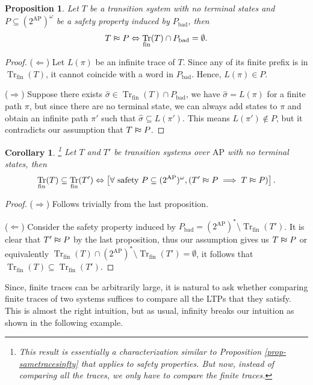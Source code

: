 \documentclass{tufte-handout} %
\newtheorem{cor}[thm]{Corollary}
\newtheorem{prop}[thm]{Proposition}
\theoremstyle{definition}
\theoremstyle{remark}
\newcommand{\0}{\textsf{0}}
\newcommand{\1}{\textsf{1}}
\newcommand{\AP}{\text{AP}}
\DeclareMathOperator{\Tr}{Tr}
\newcommand{\vSim}{\mathrel{\scalebox{1}[1.5]{$\shortmid$}\mkern-3.5mu\raisebox{0.1ex}{$\approx$}}}
\begin{document}
\begin{prop}
	Let $T$ be a transition system with no terminal states and $P\subseteq (2^{\AP})^{\omega}$ be a safety property induced by $P_{\text{bad}}$, then \[T \vSim P \Leftrightarrow \Tr_{\text{fin}}(T) \cap P_{\text{bad}} = \emptyset.\]
\end{prop}
\begin{proof}
	($\Leftarrow$) Let $L(\pi)$ be an infinite trace of $T$. Since any of its finite prefix is in $\Tr_{\text{fin}}(T)$, it cannot coincide with a word in $P_{\text{bad}}$. Hence, $L(\pi) \in P$.
	
	($\Rightarrow$) Suppose there exists $\hat{\sigma}\in \Tr_{\text{fin}}(T) \cap P_{\text{bad}}$, we have $\hat{\sigma} = L(\pi)$ for a finite path $\pi$, but since there are no terminal state, we can always add states to $\pi$ and obtain an infinite path $\pi'$ such that $\hat{\sigma} \subseteq L(\pi')$. This means $L(\pi') \notin P$, but it contradicts our assumption that $T \vSim P$.
\end{proof}
\begin{cor}\label{cor-sametracesfinite}\footnote{This result is essentially a characterization similar to Proposition \ref{prop-sametracesinfty} that applies to safety properties. But now, instead of comparing all the traces, we only have to compare the finite traces.}
	Let $T$ and $T'$ be transition systems over $\AP$ with no terminal states, then 
	\[\Tr_{\text{fin}}(T) \subseteq \Tr_{\text{fin}}(T') \Leftrightarrow \left[\forall \text{ safety } P \subseteq (2^{\AP})^{\omega}, (T' \vSim P \implies T \vSim P)\right].\]
\end{cor}
\begin{proof}
	($\Rightarrow$) Follows trivially from the last proposition.
	
	($\Leftarrow$) Consider the safety property induced by $P_{\text{bad}} = (2^{\AP})^* \setminus \Tr_{\text{fin}}(T')$. It is clear that $T'\vSim P$ by the last proposition, thus our assumption gives us $T \vSim P$ or equivalently $\Tr_{\text{fin}}(T) \cap (2^{\AP})^* \setminus \Tr_{\text{fin}}(T')= \emptyset$, it follows that $\Tr_{\text{fin}}(T) \subseteq \Tr_{\text{fin}}(T')$.
\end{proof}
Since, finite traces can be arbitrarily large, it is natural to ask whether comparing finite traces of two systems suffices to compare all the LTPs that they satisfy. This is almost the right intuition, but as usual, infinity breaks our intuition as shown in the following example.
\end{document}
